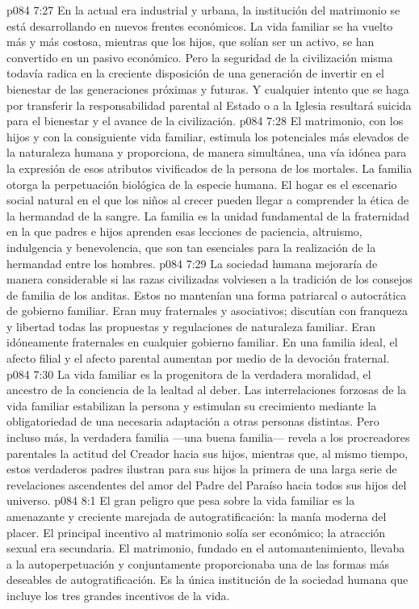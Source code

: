 \vs p084 7:27 \pc En la actual era industrial y urbana, la institución del matrimonio se está desarrollando en nuevos frentes económicos. La vida familiar se ha vuelto más y más costosa, mientras que los hijos, que solían ser un activo, se han convertido en un pasivo económico. Pero la seguridad de la civilización misma todavía radica en la creciente disposición de una generación de invertir en el bienestar de las generaciones próximas y futuras. Y cualquier intento que se haga por transferir la responsabilidad parental al Estado o a la Iglesia resultará suicida para el bienestar y el avance de la civilización.
\vs p084 7:28 \pc El matrimonio, con los hijos y con la consiguiente vida familiar, estimula los potenciales más elevados de la naturaleza humana y proporciona, de manera simultánea, una vía idónea para la expresión de esos atributos vivificados de la persona de los mortales. La familia otorga la perpetuación biológica de la especie humana. El hogar es el escenario social natural en el que los niños al crecer pueden llegar a comprender la ética de la hermandad de la sangre. La familia es la unidad fundamental de la fraternidad en la que padres e hijos aprenden esas lecciones de paciencia, altruismo, indulgencia y benevolencia, que son tan esenciales para la realización de la hermandad entre los hombres.
\vs p084 7:29 La sociedad humana mejoraría de manera considerable si las razas civilizadas volviesen a la tradición de los consejos de familia de los anditas. Estos no mantenían una forma patriarcal o autocrática de gobierno familiar. Eran muy fraternales y asociativos; discutían con franqueza y libertad todas las propuestas y regulaciones de naturaleza familiar. Eran idóneamente fraternales en cualquier gobierno familiar. En una familia ideal, el afecto filial y el afecto parental aumentan por medio de la devoción fraternal.
\vs p084 7:30 La vida familiar es la progenitora de la verdadera moralidad, el ancestro de la conciencia de la lealtad al deber. Las interrelaciones forzosas de la vida familiar estabilizan la persona y estimulan su crecimiento mediante la obligatoriedad de una necesaria adaptación a otras personas distintas. Pero incluso más, la verdadera familia ---una buena familia--- revela a los procreadores parentales la actitud del Creador hacia sus hijos, mientras que, al mismo tiempo, estos verdaderos padres ilustran para sus hijos la primera de una larga serie de revelaciones ascendentes del amor del Padre del Paraíso hacia todos sus hijos del universo.
\vs p084 8:1 El gran peligro que pesa sobre la vida familiar es la amenazante y creciente marejada de autogratificación: la manía moderna del placer. El principal incentivo al matrimonio solía ser económico; la atracción sexual era secundaria. El matrimonio, fundado en el automantenimiento, llevaba a la autoperpetuación y conjuntamente proporcionaba una de las formas más deseables de autogratificación. Es la única institución de la sociedad humana que incluye los tres grandes incentivos de la vida.
